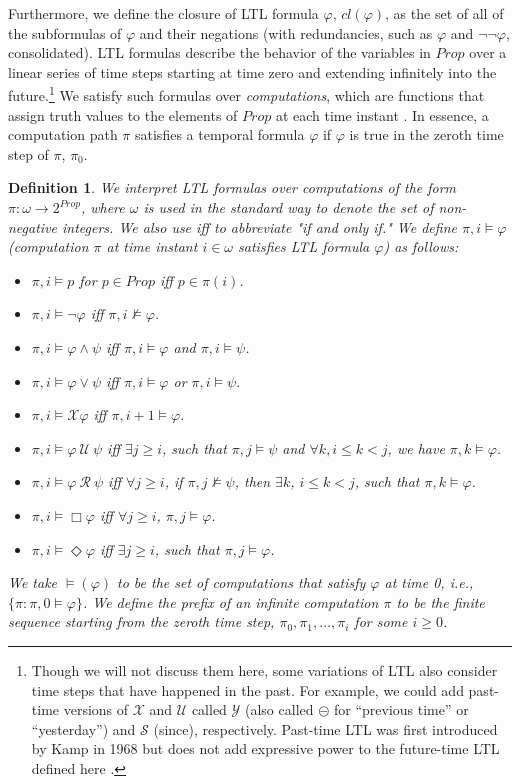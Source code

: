\documentclass{elsarticle} %
\newtheorem{defin}{Definition}
\renewcommand{\phi}{\varphi}
\begin{document}
Furthermore, we define the closure of LTL formula $\phi$, $cl(\phi)$, as the set of all of the subformulas of $\phi$ and their negations (with redundancies, such as $\phi$ and $\neg \neg \phi$, consolidated). LTL formulas describe the behavior of the variables in $Prop$ over a linear series of time steps starting at time zero and extending infinitely into the future.\footnote{Though we will not discuss them here, some variations of LTL also consider time steps that have happened in the past. For example, we could add past-time versions of $\mathcal{X}$ and  $\mathcal{U}$ called $\mathcal{Y}$ (also called $\circleddash$ for ``previous time'' or ``yesterday'') and $\mathcal{S}$ (since), respectively. Past-time LTL was first introduced by Kamp in 1968 \cite{Kam68} but does not add expressive power to the future-time LTL defined here \cite{GPSS80}.}  We satisfy such formulas over \emph{computations}, which are functions that assign truth values to the elements of $Prop$ at each time instant \cite{Eme90}. In essence, a computation path $\pi$ satisfies a temporal formula $\phi$ if $\phi$ is true in the zeroth time step of $\pi$, $\pi_0$.

\begin{defin}\label{LTL_Semantics}
We interpret LTL formulas over computations of the form $\pi : \omega \rightarrow 2^{Prop}$, where $\omega$ is used in the standard way to denote the set of non-negative integers. We also use \emph{iff} to abbreviate "if and only if." We define $\pi, i \vDash \phi$ (computation $\pi$ at time instant $i \in \omega$ satisfies LTL formula $\phi$) as follows:
\begin{itemize}
\item $\pi, i \vDash p$ for $p \in Prop$ iff $p \in \pi(i)$.
\item $\pi, i \vDash \neg \phi$ iff $\pi, i \nvDash \phi$.
\item $\pi, i \vDash \phi \wedge \psi$ iff $\pi, i \vDash \phi$ and $\pi, i \vDash \psi$.
\item $\pi, i \vDash \phi \vee \psi$ iff $\pi, i \vDash \phi$ or $\pi, i \vDash \psi$.
\item $\pi, i \vDash \mathcal{X} \phi$ iff $\pi, i+1 \vDash \phi$.
\item $\pi, i \vDash \phi \ \mathcal{U} \ \psi$ iff $\exists j \ge i$, such that $\pi, j \vDash \psi$ and $ \forall k, i \le k < j$, we have $\pi, k \vDash \phi$.
\item $\pi, i \vDash \phi \ \mathcal{R} \ \psi$ iff $\forall j \ge i$, if $\pi, j \nvDash \psi$, then $\exists k$, $i \le k < j$, such that $\pi, k \vDash \phi$.
\item $\pi, i \vDash \Box \phi$ iff $\forall j \ge i$, $\pi, j \vDash \phi$.
\item $\pi, i \vDash \Diamond \phi$ iff $\exists j \ge i$, such that $\pi, j \vDash \phi$.
\end{itemize}
\noindent
We take $\models(\phi)$ to be the set of computations that satisfy $\phi$ at time 0, i.e., $\{\pi : \pi,0\vDash\phi\}$. We define the \emph{prefix} of an infinite computation $\pi$ to be the finite sequence starting from the zeroth time step, $\pi_0, \pi_1, \ldots, \pi_i$ for some $i \ge 0$.
\end{defin} 
\end{document}
